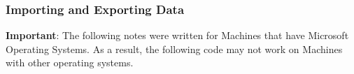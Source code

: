 \documentclass[KSmainSlides.tex]{subfiles}
\begin{document}
 
	
	
	\begin{frame}[fragile]
	\frametitle{Importing and Exporting Data}
	
	\begin{framed}
		\noindent \textbf{Important}: The following notes were written for Machines that have Microsoft Operating Systems. As a result, the following code may not work on Machines with other operating systems.
	\end{framed}
	
	\end{frame}
	
\end{document}
